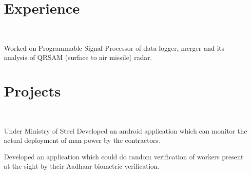 \documentclass[a4paper]{manish-resume} %
\begin{document}
\begin{minipage}[t]{0.66\textwidth} %


\section{Experience}

\\

\vspace{\topsep} %
\begin{tightitemize}
\item Worked on Programmable Signal Processor of data logger, merger and its analysis of QRSAM (surface to air missile) radar.

\end{tightitemize}

\sectionspace %

\section{Projects}

\\

\begin{tightitemize}
\item Under Ministry of Steel Developed an android application which can monitor the actual deployment of man power by the contractors. 
\item Developed an application which could do random verification of workers present at the sight by their Aadhaar biometric verification.

\end{tightitemize}
\sectionspace
{}\\


\end{minipage}
\end{document}
